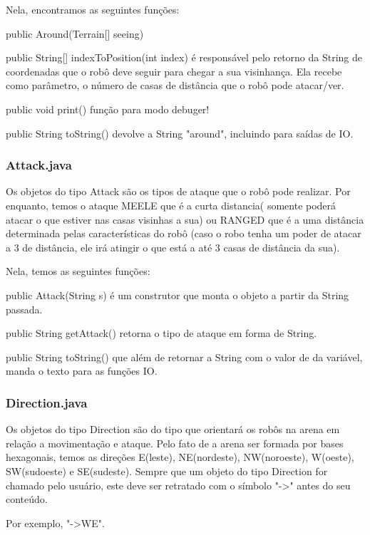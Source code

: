 \documentclass[a4paper]{article}
\begin{document}
			Nela, encontramos as seguintes funções:
			
			public Around(Terrain[] seeing)
   
    
    		public String[] indexToPosition(int index)
   			é responsável pelo retorno da String de coordenadas 
   			que o robô deve seguir para chegar a sua visinhança.
   			Ela recebe como parâmetro, o número de casas de 
   			distância que o robô pode atacar/ver.
		    
		    public void print()
    		função para modo debuger!
    
		    public String toString()
		    devolve a String "around", incluindo para saídas de IO.

		
		\subsubsection { Attack.java }
			Os objetos do tipo Attack são os tipos de
			ataque que o robô pode realizar. Por enquanto,
			temos o ataque MEELE que é a curta distancia(
			somente poderá atacar o que estiver nas casas
			visinhas a sua) ou RANGED que é a uma distância
			determinada pelas características do robô (caso
			o robo tenha um poder de atacar a 3 de distância,
			ele irá atingir o que está a até 3 casas de
			distância da sua).
			
			Nela, temos as seguintes funções:
					
			public Attack(String s)
   			é um construtor que monta o objeto a partir da
   			String passada.
			
			public String getAttack()
			retorna o tipo de ataque em forma de String.
		
			public String toString()
			que além de retornar a String com o valor de
			da variável, manda o texto para as funções IO.	
		
		\subsubsection { Direction.java }
			Os objetos do tipo Direction são do tipo que
			orientará os robôs na arena em relação a 
			movimentação e ataque. Pelo fato de a arena
			ser formada por bases hexagonais, temos as
			direções E(leste), NE(nordeste), NW(noroeste),
			W(oeste), SW(sudoeste) e SE(sudeste).
			Sempre que um objeto do tipo Direction for
			chamado pelo usuário, este deve ser retratado
			com o símbolo "->" antes do seu conteúdo.
			
			Por exemplo, "->WE".
			
\end{document}
